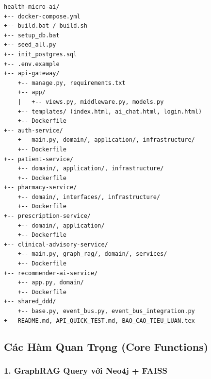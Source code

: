 \documentclass[12pt,a4paper]{article}
\begin{document}
\begin{verbatim}
health-micro-ai/
+-- docker-compose.yml
+-- build.bat / build.sh
+-- setup_db.bat
+-- seed_all.py
+-- init_postgres.sql
+-- .env.example
+-- api-gateway/
    +-- manage.py, requirements.txt
    +-- app/
    |   +-- views.py, middleware.py, models.py
    +-- templates/ (index.html, ai_chat.html, login.html)
    +-- Dockerfile
+-- auth-service/
    +-- main.py, domain/, application/, infrastructure/
    +-- Dockerfile
+-- patient-service/
    +-- domain/, application/, infrastructure/
    +-- Dockerfile
+-- pharmacy-service/
    +-- domain/, interfaces/, infrastructure/
    +-- Dockerfile
+-- prescription-service/
    +-- domain/, application/
    +-- Dockerfile
+-- clinical-advisory-service/
    +-- main.py, graph_rag/, domain/, services/
    +-- Dockerfile
+-- recommender-ai-service/
    +-- app.py, domain/
    +-- Dockerfile
+-- shared_ddd/
    +-- base.py, event_bus.py, event_bus_integration.py
+-- README.md, API_QUICK_TEST.md, BAO_CAO_TIEU_LUAN.tex
\end{verbatim}

\subsection{Các Hàm Quan Trọng (Core Functions)}

\subsubsection{1. GraphRAG Query với Neo4j + FAISS}
\end{document}
